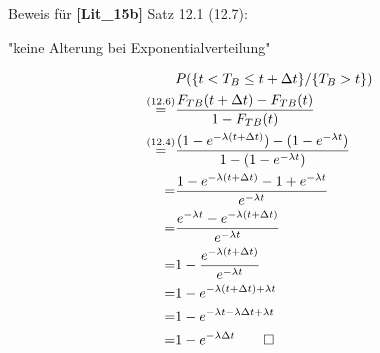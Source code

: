 \documentclass{beamer}
\begin{document}
Beweis für \textbf{[Lit\_15b]} Satz 12.1 (12.7):

"keine Alterung bei Exponentialverteilung"

\begin{align*}
	\quad & P( \lbrace t < T_B \leq t + \Delta t \rbrace / \lbrace T_B > t \rbrace)\\
	\overset{(12.6)}{=} & \frac{F_{TB}(t + \Delta t) - F_{TB}(t)}{1-F_{TB}(t)} \\
	\overset{(12.4)}{=} & \frac{(1-e^{-\lambda(t + \Delta t)}) - (1-e^{-\lambda t})}{1-(1-e^{-\lambda t})}\\
	= & \frac{1 - e^{-\lambda(t + \Delta t)} - 1 + e^{-\lambda t}}{e^{-\lambda t}} \\
	= & \frac{e^{-\lambda t} - e^{-\lambda(t + \Delta t)}}{e^{-\lambda t}} \\
	= & 1 - \frac{e^{-\lambda(t + \Delta t)}}{e^{-\lambda t}} \\
	= & 1 - e^{-\lambda(t + \Delta t) + \lambda t} \\
	= & 1 - e^{-\lambda t - \lambda \Delta t + \lambda t} \\
	= & 1 - e^{-\lambda \Delta t} \qed
\end{align*}
\end{document}
